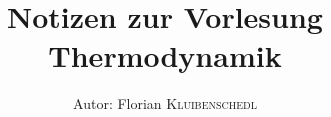 \documentclass{article}
\title{Notizen zur Vorlesung Thermodynamik} %
\author{Autor: Florian \textsc{Kluibenschedl}} %
\begin{document}
  
  \pagebreak
  
  
  
\end{document}
